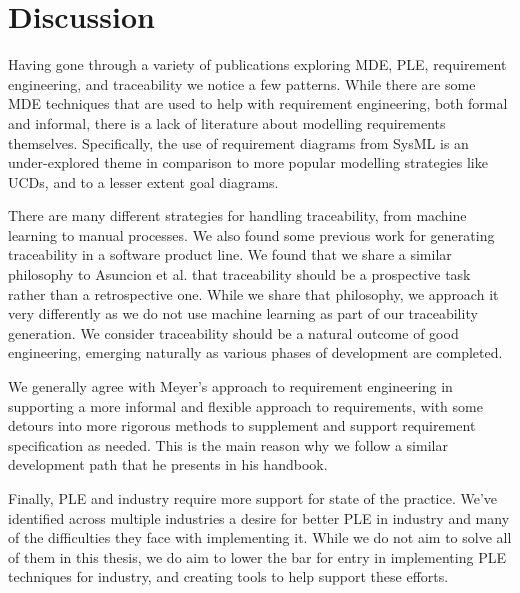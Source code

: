 \section{Discussion}

Having gone through a variety of publications exploring \ac{MDE}, \ac{PLE}, requirement engineering, and traceability we notice a few patterns. While there are some \ac{MDE} techniques that are used to help with requirement engineering, both formal and informal, there is a lack of literature about modelling requirements themselves. Specifically, the use of requirement diagrams from SysML is an under-explored theme in comparison to more popular modelling strategies like \ac{UCD}s, and to a lesser extent goal diagrams. 

There are many different strategies for handling traceability, from machine learning to manual processes. We also found some previous work for generating traceability in a software product line. We found that we share a similar philosophy to Asuncion et al. that traceability should be a prospective task rather than a retrospective one. While we share that philosophy, we approach it very differently as we do not use machine learning as part of our traceability generation. We consider traceability should be a natural outcome of good engineering, emerging naturally as various phases of development are completed.

We generally agree with Meyer's approach to requirement engineering in supporting a more informal and flexible approach to requirements, with some detours into more rigorous methods to supplement and support requirement specification as needed. This is the main reason why we follow a similar development path that he presents in his handbook.

Finally, \ac{PLE} and industry require more support for state of the practice. We've identified across multiple industries a desire for better \ac{PLE} in industry and many of the difficulties they face with implementing it. While we do not aim to solve all of them in this thesis, we do aim to lower the bar for entry in implementing \ac{PLE} techniques for industry, and creating tools to help support these efforts.

%
%

